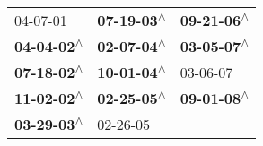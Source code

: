 \begin{supertabular}{lll}
                  04-07-01\textsuperscript{} &  \textbf{07-19-03\textsuperscript{$\wedge$}} &  \textbf{09-21-06\textsuperscript{$\wedge$}} \\
 \textbf{04-04-02\textsuperscript{$\wedge$}} &  \textbf{02-07-04\textsuperscript{$\wedge$}} &  \textbf{03-05-07\textsuperscript{$\wedge$}} \\
 \textbf{07-18-02\textsuperscript{$\wedge$}} &  \textbf{10-01-04\textsuperscript{$\wedge$}} &                   03-06-07\textsuperscript{} \\
 \textbf{11-02-02\textsuperscript{$\wedge$}} &  \textbf{02-25-05\textsuperscript{$\wedge$}} &  \textbf{09-01-08\textsuperscript{$\wedge$}} \\
 \textbf{03-29-03\textsuperscript{$\wedge$}} &                   02-26-05\textsuperscript{} &                                              \\
\end{supertabular}
